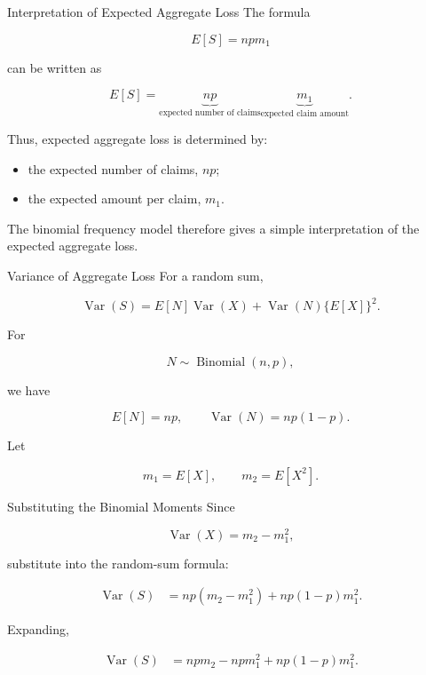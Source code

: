 \documentclass[
  ignorenonframetext,
  aspectratio=169,
]{beamer}
\providecommand{\tightlist}{%
  \setlength{\itemsep}{0pt}\setlength{\parskip}{0pt}}
\begin{document}
\begin{frame}{Interpretation of Expected Aggregate Loss}
\protect{}\label{interpretation-of-expected-aggregate-loss}
The formula

\[
E[S]=npm_1
\]

can be written as

\[
\boxed{
E[S]
=
\underbrace{np}_{\text{expected number of claims}}
\underbrace{m_1}_{\text{expected claim amount}}
}.
\]

Thus, expected aggregate loss is determined by:

\begin{itemize}
\tightlist
\item
  the expected number of claims, \(np\);
\item
  the expected amount per claim, \(m_1\).
\end{itemize}

The binomial frequency model therefore gives a simple interpretation of
the expected aggregate loss.
\end{frame}

\begin{frame}{Variance of Aggregate Loss}
\protect{}\label{variance-of-aggregate-loss}
For a random sum,

\[
\operatorname{Var}(S)
=
E[N]\operatorname{Var}(X)
+
\operatorname{Var}(N)\{E[X]\}^2.
\]

For

\[
N\sim\operatorname{Binomial}(n,p),
\]

we have

\[
E[N]=np,
\qquad
\operatorname{Var}(N)=np(1-p).
\]

Let

\[
m_1=E[X],
\qquad
m_2=E[X^2].
\]
\end{frame}

\begin{frame}{Substituting the Binomial Moments}
\protect{}\label{substituting-the-binomial-moments}
Since

\[
\operatorname{Var}(X)=m_2-m_1^2,
\]

substitute into the random-sum formula:

\[
\begin{aligned}
\operatorname{Var}(S)
&=np(m_2-m_1^2)
+np(1-p)m_1^2.
\end{aligned}
\]

Expanding,

\[
\begin{aligned}
\operatorname{Var}(S)
&=npm_2-npm_1^2
+np(1-p)m_1^2.
\end{aligned}
\]
\end{frame}
\end{document}
